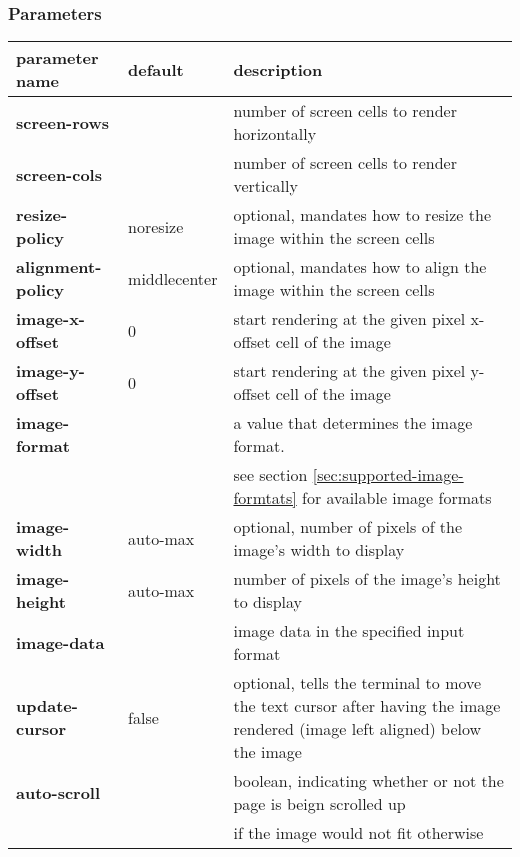 \documentclass[a4paper]{article}
\begin{document}
\subsubsection*{Parameters}

\begin{tabular}{|l|l|l|}
    \hline
    \textbf{parameter name} & \textbf{default} & \textbf{description} \\
    \hline
    \textbf{screen-rows}      &                  & number of screen cells to render horizontally \\
    \textbf{screen-cols}      &                  & number of screen cells to render vertically \\
    \textbf{resize-policy}    & noresize         & optional, mandates how to resize the image within the screen cells \\
    \textbf{alignment-policy} & middlecenter     & optional, mandates how to align the image within the screen cells \\
    \textbf{image-x-offset}   & 0                & start rendering at the given pixel x-offset cell of the image \\
    \textbf{image-y-offset}   & 0                & start rendering at the given pixel y-offset cell of the image \\
    \textbf{image-format}     &                  & a value that determines the image format. \\
                              &                  & see section \ref{sec:supported-image-formtats} for available image formats \\
    \textbf{image-width}      & auto-max         & optional, number of pixels of the image's width to display \\
    \textbf{image-height}     & auto-max         & number of pixels of the image's height to display \\
    \textbf{image-data}       &                  & image data in the specified input format \\
    \textbf{update-cursor}    & false            & optional, tells the terminal to move the text cursor after having the image rendered (image left aligned) below the image \\
    \textbf{auto-scroll}      &                  & boolean, indicating whether or not the page is beign scrolled up \\
                              &                  & if the image would not fit otherwise \\
    \hline
\end{tabular}
\end{document}
